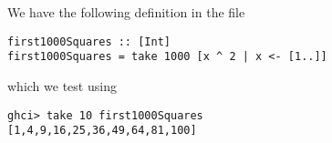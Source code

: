 
We have the following definition in the file 
\begin{verbatim}
first1000Squares :: [Int]
first1000Squares = take 1000 [x ^ 2 | x <- [1..]]
\end{verbatim}
which we test using
\begin{verbatim}
ghci> take 10 first1000Squares
[1,4,9,16,25,36,49,64,81,100]
\end{verbatim}
